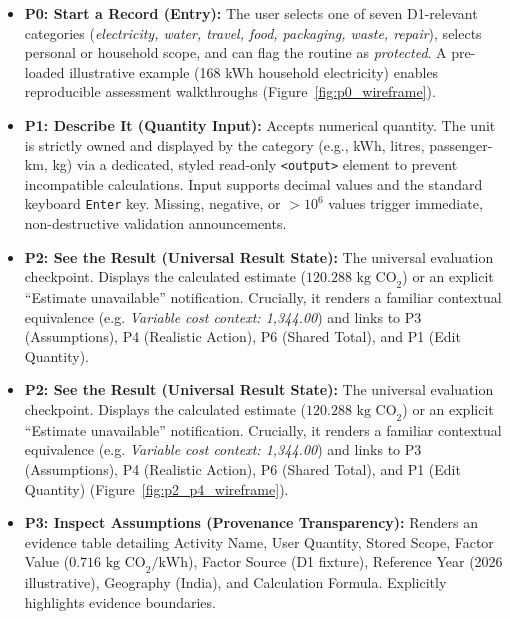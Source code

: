 \documentclass[12pt,a4paper]{article}
\newcommand{\code}[1]{\texttt{#1}}
\providecommand{\rupee}{\text{INR~}}
\begin{document}
\begin{itemize}[leftmargin=*]
  \item \textbf{P0: Start a Record (Entry):} The user selects one of seven D1-relevant categories (\emph{electricity, water, travel, food, packaging, waste, repair}), selects personal or household scope, and can flag the routine as \emph{protected}. A pre-loaded illustrative example (168 kWh household electricity) enables reproducible assessment walkthroughs (Figure~\ref{fig:p0_wireframe}).
  
  \item \textbf{P1: Describe It (Quantity Input):} Accepts numerical quantity. The unit is strictly owned and displayed by the category (e.g., kWh, litres, passenger-km, kg) via a dedicated, styled read-only \code{<output>} element to prevent incompatible calculations. Input supports decimal values and the standard keyboard \code{Enter} key. Missing, negative, or $>10^6$ values trigger immediate, non-destructive validation announcements.
  
  \item \textbf{P2: See the Result (Universal Result State):} The universal evaluation checkpoint. Displays the calculated estimate ($120.288\text{ kg CO}_2$) or an explicit ``Estimate unavailable'' notification. Crucially, it renders a familiar contextual equivalence (e.g. \emph{Variable cost context: \rupee 1,344.00}) and links to P3 (Assumptions), P4 (Realistic Action), P6 (Shared Total), and P1 (Edit Quantity).
  \item \textbf{P2: See the Result (Universal Result State):} The universal evaluation checkpoint. Displays the calculated estimate ($120.288\text{ kg CO}_2$) or an explicit ``Estimate unavailable'' notification. Crucially, it renders a familiar contextual equivalence (e.g. \emph{Variable cost context: \rupee 1,344.00}) and links to P3 (Assumptions), P4 (Realistic Action), P6 (Shared Total), and P1 (Edit Quantity) (Figure~\ref{fig:p2_p4_wireframe}).
  
  \item \textbf{P3: Inspect Assumptions (Provenance Transparency):} Renders an evidence table detailing Activity Name, User Quantity, Stored Scope, Factor Value ($0.716\text{ kg CO}_2\text{/kWh}$), Factor Source (D1 fixture), Reference Year (2026 illustrative), Geography (India), and Calculation Formula. Explicitly highlights evidence boundaries.
  

\end{itemize}
\end{document}
